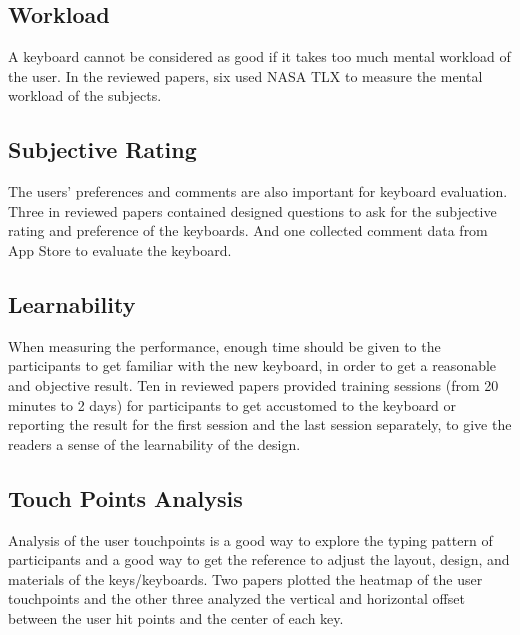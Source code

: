 \documentclass[11pt]{article}
\begin{document}
\subsection{Workload}
A keyboard cannot be considered as good if it takes too much mental workload of the user. In the reviewed papers, six used NASA TLX \citep{hart1986nasa} to measure the mental workload of the subjects.

\subsection{Subjective Rating}
The users' preferences and comments are also important for keyboard evaluation. Three in reviewed papers contained designed questions to ask for the subjective rating and preference of the keyboards. And one \citep{10.1145/1520340.1520380} collected comment data from App Store to evaluate the keyboard.

\subsection{Learnability}
When measuring the performance, enough time should be given to the participants to get familiar with the new keyboard, in order to get a reasonable and objective result. Ten in reviewed papers provided training sessions (from 20 minutes to 2 days) for participants to get accustomed to the keyboard or reporting the result for the first session and the last session separately, to give the readers a sense of the learnability of the design.

\subsection{Touch Points Analysis}
Analysis of the user touchpoints is a good way to explore the typing pattern of participants and a good way to get the reference to adjust the layout, design, and materials of the keys/keyboards. Two papers plotted the heatmap of the user touchpoints and the other three analyzed the vertical and horizontal offset between the user hit points and the center of each key. 
\end{document}
